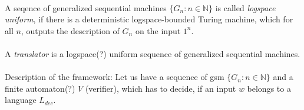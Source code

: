 \documentclass[12pt,oneside,a4paper]{book}
\begin{document}
\paragraph{}
 A seqence of generalized sequential machines $\{G_n:n \in \mathbb{N}\}$ is called \emph{logspace uniform}, if there is a deterministic logspace-bounded Turing machine, which for all $n$, outputs the description of $G_{n}$ on the input $1^n$.

\paragraph{}
 A \emph{translator} is a logspace(?) uniform sequence of generalized sequential machines.

\paragraph{}
Description of the framework: Let us have a sequence of gsm $\{G_n:n \in \mathbb{N}\}$ and a finite automaton(?) $V$ (verifier), which has to decide, if an input $w$ belongs to a language $L_{dec}$.
\end{document}
